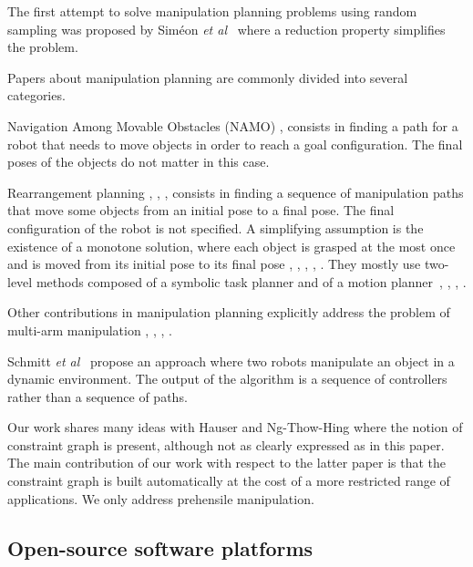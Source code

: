 The first attempt to solve manipulation planning problems using random sampling
was proposed by {\color{blue}Siméon \textit{et al}}~\cite{simeon2004ijrr} where a reduction property simplifies the problem.

Papers about manipulation planning are commonly divided into several categories.

Navigation Among Movable Obstacles (NAMO) \cite{wilfong1988motion}, \cite{stilman2008planning} consists in finding
a path for a robot that needs to move objects in order to reach a goal
configuration. The final poses of the objects do not matter in this case.

Rearrangement planning \cite{ota2004rearrangement}, \cite{LIS210},
\cite{KroBek2015}, \cite{LerPha2015} consists in finding a sequence of
manipulation paths that move some objects from an initial pose to a
final pose. The final configuration of the robot is not specified. A
simplifying assumption is the existence of a monotone solution, where each object is grasped at the most once and is moved from
its initial pose to its final pose \cite{stilman2008planning},
\cite{stilman2007manipulation}, \cite{srivastavaetal2014icra}, \cite{nieuwenhuisen2008effective},
\cite{ota2004rearrangement}. They mostly use two-level methods
composed of a symbolic task planner and of a motion
planner~\cite{cambon:hal-01976081}, \cite{KaeLoz2013}, \cite{LozKae2014}, \cite{18-toussaint-RSS}.

Other contributions in manipulation planning explicitly address the problem of multi-arm manipulation \cite{GhaCorSim2009}, \cite{HarTsuLau2014}, \cite{DobBek2015}, \cite{XiaLerPha2017}.

{\color{blue}Schmitt \textit{et al}}~\cite{schmitt19icra} propose an approach where two robots manipulate an object in a dynamic environment. The output of the algorithm is a sequence of controllers rather than a sequence of paths.

Our work shares many ideas with {\color{blue}Hauser and Ng-Thow-Hing} \cite{HauNgt2011} where the notion of constraint
graph is present, although not as clearly expressed as in this paper. The main
contribution of our work with respect to the latter paper is that the
constraint graph is built automatically at the cost of a more restricted range
of applications. We only address prehensile manipulation.

\subsection{Open-source software platforms}

